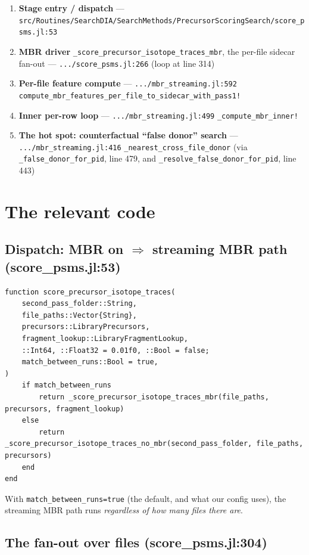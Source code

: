 \documentclass[11pt]{article}
\begin{document}
\begin{enumerate}
\item \textbf{Stage entry / dispatch} ---
\texttt{src/Routines/SearchDIA/SearchMethods/PrecursorScoringSearch/score\_psms.jl:53}
\item \textbf{MBR driver} \texttt{\_score\_precursor\_isotope\_traces\_mbr}, the
per-file sidecar fan-out ---
\texttt{.../score\_psms.jl:266} (loop at line 314)
\item \textbf{Per-file feature compute} ---
\texttt{.../mbr\_streaming.jl:592}
\texttt{compute\_mbr\_features\_per\_file\_to\_sidecar\_with\_pass1!}
\item \textbf{Inner per-row loop} ---
\texttt{.../mbr\_streaming.jl:499} \texttt{\_compute\_mbr\_inner!}
\item \textbf{The hot spot: counterfactual ``false donor'' search} ---
\texttt{.../mbr\_streaming.jl:416} \texttt{\_nearest\_cross\_file\_donor}
(via \texttt{\_false\_donor\_for\_pid}, line 479, and
\texttt{\_resolve\_false\_donor\_for\_pid}, line 443)
\end{enumerate}

\section{The relevant code}

\subsection{Dispatch: MBR on $\Rightarrow$ streaming MBR path (score\_psms.jl:53)}

\begin{lstlisting}[firstnumber=53]
function score_precursor_isotope_traces(
    second_pass_folder::String,
    file_paths::Vector{String},
    precursors::LibraryPrecursors,
    fragment_lookup::LibraryFragmentLookup,
    ::Int64, ::Float32 = 0.01f0, ::Bool = false;
    match_between_runs::Bool = true,
)
    if match_between_runs
        return _score_precursor_isotope_traces_mbr(file_paths, precursors, fragment_lookup)
    else
        return _score_precursor_isotope_traces_no_mbr(second_pass_folder, file_paths, precursors)
    end
end
\end{lstlisting}

\noindent With \texttt{match\_between\_runs=true} (the default, and what our config
uses), the streaming MBR path runs \emph{regardless of how many files there are}.

\subsection{The fan-out over files (score\_psms.jl:304)}
\end{document}
